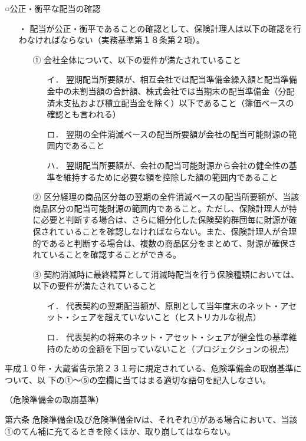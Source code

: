 \documentclass[report,gutter=10mm,fore-edge=10mm,uplatex,dvipdfmx]{jlreq}
\begin{document}
○公正・衡平な配当の確認
\begin{itemize}
\item[・]配当が公正・衡平であることの確認として、保険計理人は以下の確認を行わなければならない（実務基準第１８条第２項）。
\begin{itemize}
\item[①]会社全体について、以下の要件が満たされていること
\begin{itemize}
\item[イ． ] 翌期配当所要額が、相互会社では配当準備金繰入額と配当準備金中の未割当額の合計額、株式会社では当期末の配当準備金（分配済未支払および積立配当金を除く）以下であること（簿価ベースの確認とも言われる）
\item[ロ． ] 翌期の全件消滅ベースの配当所要額が会社の配当可能財源の範囲内であること
\item[ハ． ] 翌期配当所要額が、会社の配当可能財源から会社の健全性の基準を維持するために必要な額を控除した額の範囲内であること
\end{itemize}
\item[②] 区分経理の商品区分毎の翌期の全件消滅ベースの配当所要額が、当該商品区分の配当可能財源の範囲内であること。ただし、保険計理人が特に必要と判断する場合は、さらに細分化した保険契約群団毎に財源が確保されていることを確認しなければならない。また、保険計理人が合理的であると判断する場合は、複数の商品区分をまとめて、財源が確保されていることを確認することができる。
\item[③] 契約消滅時に最終精算として消滅時配当を行う保険種類においては、以下の要件が満たされていること
\begin{itemize}
\item[イ．] 代表契約の翌期配当額が、原則として当年度末のネット・アセット・シェアを超えていないこと（ヒストリカルな視点）
\item[ロ．] 代表契約の将来のネット・アセット・シェアが健全性の基準維持のための金額を下回っていないこと（プロジェクションの視点）
\end{itemize}
\end{itemize}
\end{itemize}


平成１０年・大蔵省告示第２３１号に規定されている、危険準備金の取崩基準について、以
下の①～⑤の空欄に当てはまる適切な語句を記入しなさい。

（危険準備金の取崩基準）

第六条 危険準備金Ⅰ及び危険準備金Ⅳは、それぞれ①がある場合において、当該
①のてん補に充てるときを除くほか、取り崩してはならない。
\end{document}
